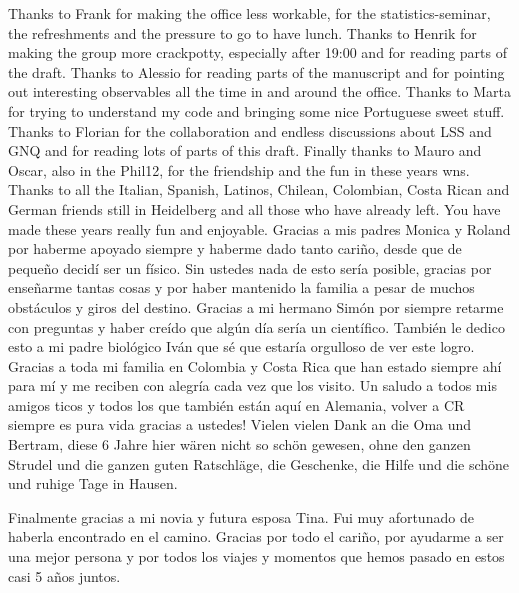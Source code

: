\documentclass[
11pt, %
german, english,%
singlespacing, %
headsepline, %
]{MastersDoctoralThesis} %
\begin{document}
\begin{acknowledgements}
Thanks to Frank for making the office less workable, for the statistics-seminar, the refreshments and the pressure to go to have lunch. Thanks to Henrik for making the group more crackpotty, especially after 19:00 and for reading parts of the draft. Thanks to Alessio for reading parts of the manuscript and for pointing out interesting observables all the time in and around the office.
Thanks to Marta for trying to understand my code and bringing some nice Portuguese sweet stuff. Thanks to Florian for the collaboration and endless discussions about LSS and GNQ and for reading lots of parts of this draft.
Finally thanks to Mauro and Oscar, also in the Phil12, for the friendship and the fun in these years wns. 
Thanks to all the Italian, Spanish, Latinos, Chilean, Colombian, Costa Rican and German friends still in Heidelberg and all those who have already left. You have made these years really fun and enjoyable.
\newpage
Gracias a mis padres Monica y Roland por haberme apoyado siempre y haberme dado tanto cariño, desde que de pequeño decidí ser un físico. Sin ustedes nada de esto sería posible, gracias por enseñarme tantas cosas y por haber mantenido la familia a pesar de muchos obstáculos y giros del destino.
Gracias a mi hermano Simón por siempre retarme con preguntas y haber creído que algún día sería un científico. También le dedico esto a mi padre biológico Iván que sé que estaría orgulloso de ver este logro.
Gracias a toda mi familia en Colombia y Costa Rica que han estado siempre ahí para mí y me reciben con alegría cada vez que los visito.
Un saludo a todos mis amigos ticos y todos los que también están aquí en Alemania, volver a CR siempre es pura vida gracias a ustedes!
Vielen vielen Dank an die Oma und Bertram, diese 6 Jahre hier wären nicht so schön gewesen, ohne den ganzen Strudel und die ganzen guten Ratschläge, die Geschenke, die Hilfe und die schöne und ruhige Tage in Hausen.

Finalmente gracias a mi novia y futura esposa Tina. Fui muy afortunado de haberla encontrado en el camino. Gracias por todo el cariño, por ayudarme a ser una mejor persona y por todos los viajes y momentos que hemos pasado en estos casi 5 años juntos.





\end{acknowledgements}

\end{document}
